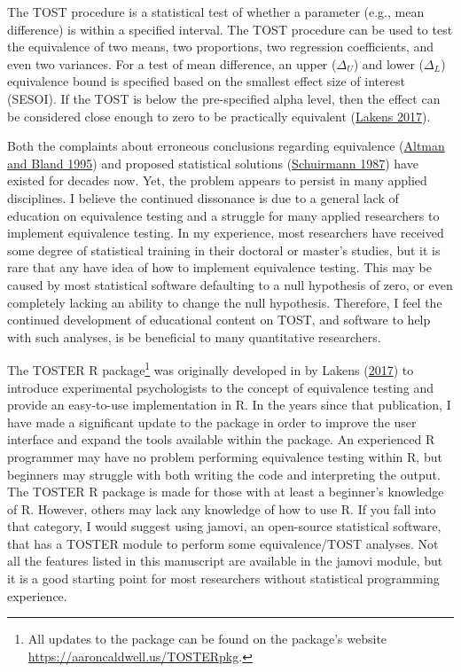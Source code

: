\documentclass[
]{interact}
\begin{document}
The TOST procedure is a statistical test of whether a parameter (e.g.,
mean difference) is within a specified interval. The TOST procedure can
be used to test the equivalence of two means, two proportions, two
regression coefficients, and even two variances. For a test of mean
difference, an upper (\(\Delta_U\)) and lower (\(\Delta_L\)) equivalence
bound is specified based on the smallest effect size of interest
(SESOI). If the TOST is below the pre-specified alpha level, then the
effect can be considered close enough to zero to be practically
equivalent (\protect\hyperlink{ref-lakens_ori}{Lakens 2017}).

Both the complaints about erroneous conclusions regarding equivalence
(\protect\hyperlink{ref-blandaltman95}{Altman and Bland 1995}) and
proposed statistical solutions
(\protect\hyperlink{ref-schuirmann1987}{Schuirmann 1987}) have existed
for decades now. Yet, the problem appears to persist in many applied
disciplines. I believe the continued dissonance is due to a general lack
of education on equivalence testing and a struggle for many applied
researchers to implement equivalence testing. In my experience, most
researchers have received some degree of statistical training in their
doctoral or master's studies, but it is rare that any have idea of how
to implement equivalence testing. This may be caused by most statistical
software defaulting to a null hypothesis of zero, or even completely
lacking an ability to change the null hypothesis. Therefore, I feel the
continued development of educational content on TOST, and software to
help with such analyses, is be beneficial to many quantitative
researchers.

The TOSTER R package\footnote{All updates to the package can be found on
  the package's website \url{https://aaroncaldwell.us/TOSTERpkg}.} was
originally developed in by Lakens
(\protect\hyperlink{ref-lakens_ori}{2017}) to introduce experimental
psychologists to the concept of equivalence testing and provide an
easy-to-use implementation in R. In the years since that publication, I
have made a significant update to the package in order to improve the
user interface and expand the tools available within the package. An
experienced R programmer may have no problem performing equivalence
testing within R, but beginners may struggle with both writing the code
and interpreting the output. The TOSTER R package is made for those with
at least a beginner's knowledge of R. However, others may lack any
knowledge of how to use R. If you fall into that category, I would
suggest using jamovi, an open-source statistical software, that has a
TOSTER module to perform some equivalence/TOST analyses. Not all the
features listed in this manuscript are available in the jamovi module,
but it is a good starting point for most researchers without statistical
programming experience.
\end{document}
